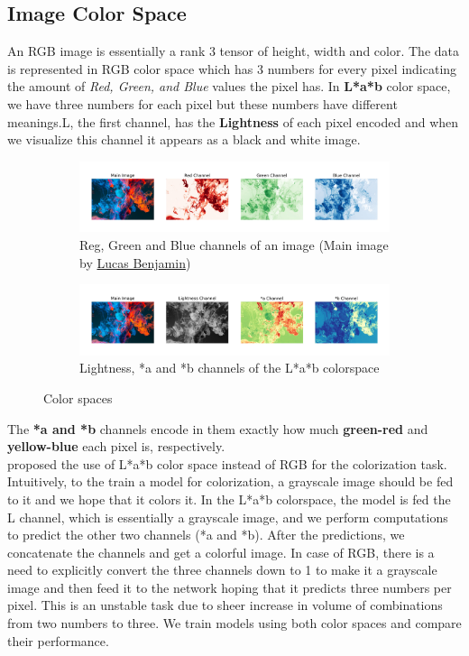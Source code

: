 \documentclass{article} %
\begin{document}
    \subsection{Image Color Space}
\hspace{0.167 in}An RGB image is essentially a rank 3 tensor of height, width and color. The data is represented in RGB color space which has 3 numbers for every pixel indicating the amount of \textit{Red, Green, and Blue} values the pixel has. In \textbf{L*a*b} color space, we have three numbers for each pixel but these numbers have different meanings.L, the first channel, has the \textbf{Lightness} of each pixel encoded and when we visualize this channel it appears as a black and white image. 
    \begin{figure}[!htb]
    \centering
    \begin{subfigure}[b]{0.9\textwidth}
        \centering
    	\includegraphics[width=\textwidth]{figures/rgb_colorspace}
    	\caption{Reg, Green and Blue channels of an image (Main image by \href{https://unsplash.com/@aznbokchoy}{Lucas Benjamin})}
    	\label{rgb_colorspace}
    \end{subfigure}
    \begin{subfigure}[b]{0.9\textwidth}
        \centering
    	\includegraphics[width=\textwidth]{figures/Lab_colorspace}
    	\caption{Lightness, *a and *b channels of the L*a*b colorspace}
    	\label{lab_colorspace}
    \end{subfigure}
    \caption{Color spaces}
    \end{figure}
    The \textbf{*a and *b} channels encode in them exactly how much \textbf{green-red} and \textbf{yellow-blue} each pixel is, respectively.\\
\hspace*{0.167 in}\cite{guadarrama2017pixcolor,isola2018imagetoimage} proposed the use of L*a*b color space instead of RGB for the colorization task. Intuitively, to the train a model for colorization, a grayscale image should be fed to it and we hope that it colors it. In the L*a*b colorspace, the model is fed the L channel, which is essentially a grayscale image, and we perform computations to predict the other two channels (*a and *b). After the predictions, we concatenate the channels and get a colorful image. In case of RGB, there is a need to explicitly convert the three channels down to 1 to make it a grayscale image and then feed it to the network hoping that it predicts three numbers per pixel. This is an unstable task due to sheer increase in volume of combinations from two numbers to three. We train models using both color spaces and compare their performance.
\end{document}
